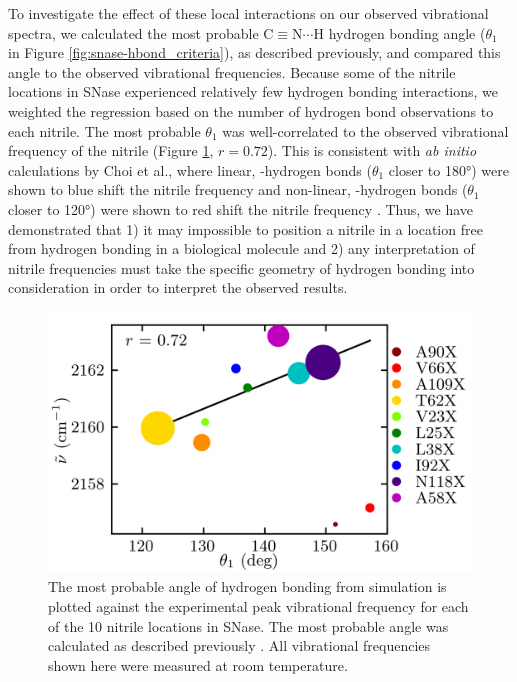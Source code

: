To investigate the effect of these local interactions on our observed vibrational spectra, we calculated the most probable C$\equiv$N$\cdots$H hydrogen bonding angle ($\theta_1$ in Figure \ref{fig:snase-hbond_criteria}), as described previously, and compared this angle to the observed vibrational frequencies. 
Because some of the nitrile locations in SNase experienced relatively few hydrogen bonding interactions, we weighted the regression based on the number of hydrogen bond observations to each nitrile. 
The most probable $\theta_1$ was well-correlated to the observed vibrational frequency of the nitrile (Figure \ref{fig:snase-theta_vs_freq}, $r = 0.72$). 
This is consistent with \emph{ab initio} calculations by Choi et al., where linear, \textsigma-hydrogen bonds ($\theta_1$ closer to \ang{180}) were shown to blue shift the nitrile frequency and non-linear, \textpi-hydrogen bonds ($\theta_1$ closer to \ang{120}) were shown to red shift the nitrile frequency \cite{Choi2008, First2018}. 
Thus, we have demonstrated that 
1) it may impossible to position a nitrile in a location free from hydrogen bonding in a biological molecule and 
2) any interpretation of nitrile frequencies must take the specific geometry of hydrogen bonding into consideration in order to interpret the observed results.

\begin{figure}
    \center
    \includegraphics[width=\single]{figures-snase/weighted_abs_max_vs_max_theta.png}
    \caption[The most probable angle of hydrogen bonding against the experimental vibrational frequency]{
        The most probable angle of hydrogen bonding from simulation is plotted against the experimental peak vibrational frequency for each of the 10 nitrile locations in SNase. 
        The most probable angle was calculated as described previously \cite{First2018}. 
        All vibrational frequencies shown here were measured at room temperature. 
    }
    \label{fig:snase-theta_vs_freq}
\end{figure}

